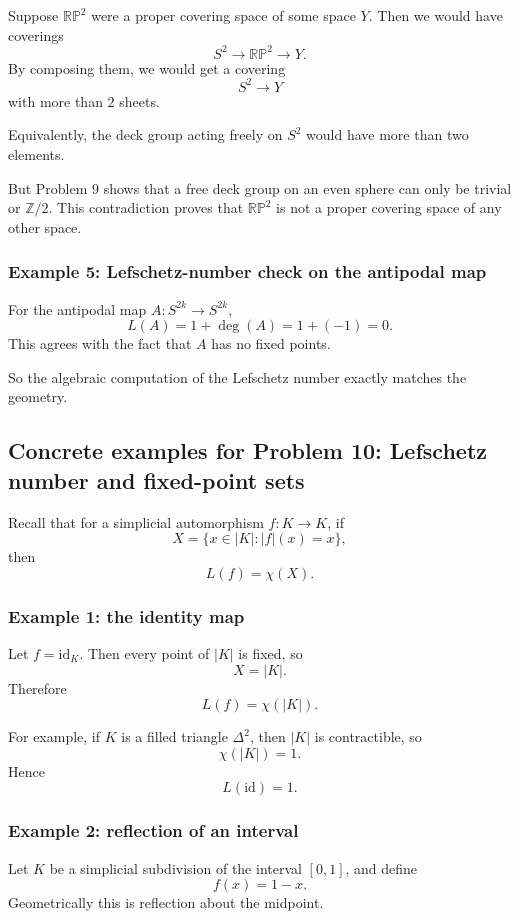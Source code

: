 \documentclass[12pt,a4paper]{article}
\newcommand{\Z}{\mathbb{Z}}
\newcommand{\RP}{\mathbb{RP}}
\theoremstyle{notespace}
\begin{document}
Suppose \(\RP^2\) were a proper covering space of some space \(Y\). Then we would have coverings
\[
S^2\to \RP^2\to Y.
\]
By composing them, we would get a covering
\[
S^2\to Y
\]
with more than \(2\) sheets.

Equivalently, the deck group acting freely on \(S^2\) would have more than two elements.

But Problem 9 shows that a free deck group on an even sphere can only be trivial or \(\Z/2\). This contradiction proves that \(\RP^2\) is not a proper covering space of any other space.

\subsubsection*{Example 5: Lefschetz-number check on the antipodal map}

For the antipodal map \(A:S^{2k}\to S^{2k}\),
\[
L(A)=1+\deg(A)=1+(-1)=0.
\]
This agrees with the fact that \(A\) has no fixed points.

So the algebraic computation of the Lefschetz number exactly matches the geometry.

\subsection{Concrete examples for Problem 10: Lefschetz number and fixed-point sets}

Recall that for a simplicial automorphism \(f:K\to K\), if
\[
X=\{x\in |K|: |f|(x)=x\},
\]
then
\[
L(f)=\chi(X).
\]

\subsubsection*{Example 1: the identity map}

Let \(f=\mathrm{id}_K\). Then every point of \(|K|\) is fixed, so
\[
X=|K|.
\]
Therefore
\[
L(f)=\chi(|K|).
\]

For example, if \(K\) is a filled triangle \(\Delta^2\), then \(|K|\) is contractible, so
\[
\chi(|K|)=1.
\]
Hence
\[
L(\mathrm{id})=1.
\]

\subsubsection*{Example 2: reflection of an interval}

Let \(K\) be a simplicial subdivision of the interval \([0,1]\), and define
\[
f(x)=1-x.
\]
Geometrically this is reflection about the midpoint.
\end{document}
